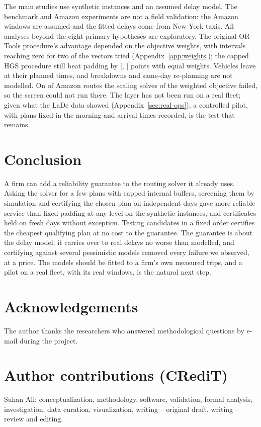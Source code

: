 \documentclass[11pt,a4paper]{article}
\theoremstyle{remark}
\begin{document}
The main studies use synthetic instances and an assumed delay model. The benchmark
and Amazon experiments are not a field validation: the Amazon windows are assumed and
the fitted delays come from New York taxis. All analyses beyond the eight primary
hypotheses are exploratory. The original OR-Tools procedure's advantage depended on the
objective weights, with intervals reaching zero for two of the vectors tried
(Appendix~\ref{app:weights}); the capped HGS procedure still beat padding by \HwEqPad{}
[\HwEqPadLo, \HwEqPadHi] points with equal weights. Vehicles leave at their planned times,
and breakdowns and same-day re-planning are not modelled. On \AmzHNotRun{} of \AmzHRoutes{}
Amazon routes the scaling solves of the weighted objective failed, so the screen could
not run there. The layer has not been run on a real fleet; given what the LaDe data
showed (Appendix~\ref{sec:real-ops}), a controlled pilot, with plans fixed in the morning
and arrival times recorded, is the test that remains.

\section{Conclusion}\label{sec:conclusion}

A firm can add a reliability guarantee to the routing solver it already uses. Asking
the solver for a few plans with capped internal buffers, screening them by
simulation and certifying the chosen plan on independent days gave more reliable
service than fixed padding at any level on the synthetic instances, and certificates
held on fresh days without exception. Testing candidates in a fixed order certifies
the cheapest qualifying plan at no cost to the guarantee. The guarantee is about the
delay model; it carries over to real delays no worse than modelled, and certifying
against several pessimistic models removed every failure we observed, at a price. The models should be fitted to a
firm's own measured trips, and a pilot on a real fleet, with its real windows, is the
natural next step.


\section*{Acknowledgements}
The author thanks the researchers who answered methodological questions by e-mail
during the project.


\section*{Author contributions (CRediT)}
 Suhan Ali: conceptualization, methodology, software,
validation, formal analysis, investigation, data curation, visualization, writing --
original draft, writing -- review and editing.
\end{document}
